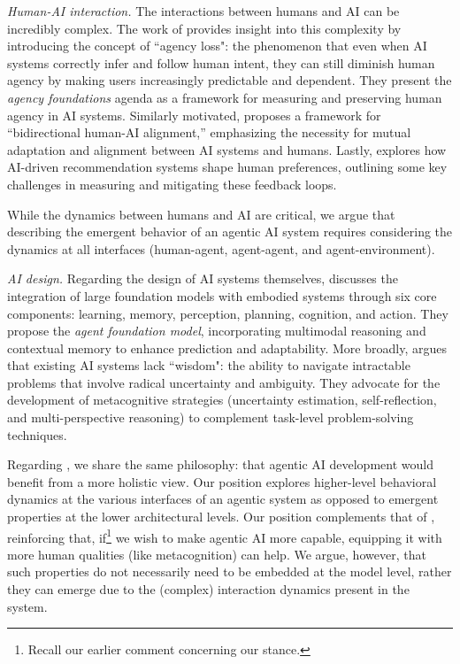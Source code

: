 \documentclass{article}
\theoremstyle{plain}
\theoremstyle{definition}
\theoremstyle{remark}
\begin{document}
\emph{Human-AI interaction.} The interactions between humans and AI can be incredibly complex. The work of \cite{mitelutposition} provides insight into this complexity by introducing the concept of ``agency loss": the phenomenon that even when AI systems correctly infer and follow human intent, they can still diminish human agency by making users increasingly predictable and dependent. They present the \emph{agency foundations} agenda as a framework for measuring and preserving human agency in AI systems. Similarly motivated, \cite{shen2024towards} proposes a framework for ``bidirectional human-AI alignment,'' emphasizing the necessity for mutual adaptation and alignment between AI systems and humans. Lastly, \cite{pedreschi2024human} explores how AI-driven recommendation systems shape human preferences, outlining some key challenges in measuring and mitigating these feedback loops.

While the dynamics between humans and AI are critical, we argue that describing the emergent behavior of an agentic AI system requires considering the dynamics at all interfaces (human-agent, agent-agent, and agent-environment). 


\emph{AI design.} Regarding the design of AI systems themselves, \cite{huang2024position} discusses the integration of large foundation models with embodied systems through six core components: learning, memory, perception, planning, cognition, and action. They propose the \emph{agent foundation model}, incorporating multimodal reasoning and contextual memory to enhance prediction and adaptability. More broadly, \cite{johnson2024imagining} argues that existing AI systems lack ``wisdom": the ability to navigate intractable problems that involve radical uncertainty and ambiguity. They advocate for the development of metacognitive strategies (uncertainty estimation, self-reflection, and multi-perspective reasoning) to complement task-level problem-solving techniques. 

Regarding \cite{huang2024position}, we share the same philosophy: that agentic AI development would benefit from a more holistic view. Our position explores higher-level behavioral dynamics at the various interfaces of an agentic system as opposed to emergent properties at the lower architectural levels. Our position complements that of \cite{johnson2024imagining}, reinforcing that, if\footnote{Recall our earlier comment concerning our stance.} we wish to make agentic AI more capable, equipping it with more human qualities (like metacognition) can help. We argue, however, that such properties do not necessarily need to be embedded at the model level, rather they can emerge due to the (complex) interaction dynamics present in the system.
\end{document}
